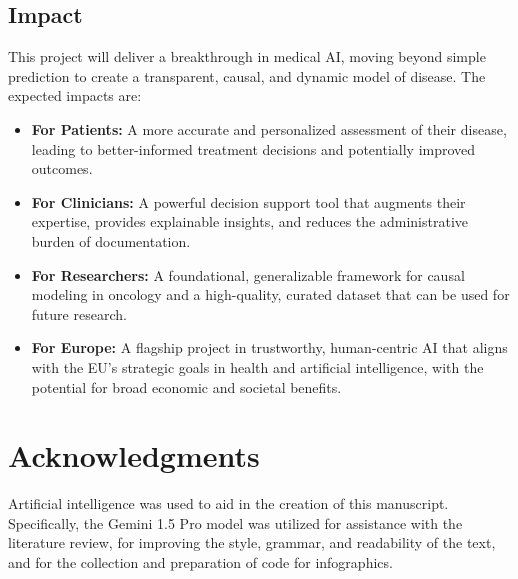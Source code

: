 \documentclass[11pt, a4paper]{article}
\begin{document}
\subsection{Impact}
This project will deliver a breakthrough in medical AI, moving beyond simple prediction to create a transparent, causal, and dynamic model of disease. The expected impacts are:
\begin{itemize}
    \item \textbf{For Patients:} A more accurate and personalized assessment of their disease, leading to better-informed treatment decisions and potentially improved outcomes.
    \item \textbf{For Clinicians:} A powerful decision support tool that augments their expertise, provides explainable insights, and reduces the administrative burden of documentation.
    \item \textbf{For Researchers:} A foundational, generalizable framework for causal modeling in oncology and a high-quality, curated dataset that can be used for future research.
    \item \textbf{For Europe:} A flagship project in trustworthy, human-centric AI that aligns with the EU's strategic goals in health and artificial intelligence, with the potential for broad economic and societal benefits.
\end{itemize}

\section*{Acknowledgments}
Artificial intelligence was used to aid in the creation of this manuscript. Specifically, the Gemini 1.5 Pro model was utilized for assistance with the literature review, for improving the style, grammar, and readability of the text, and for the collection and preparation of code for infographics.



\end{document}
